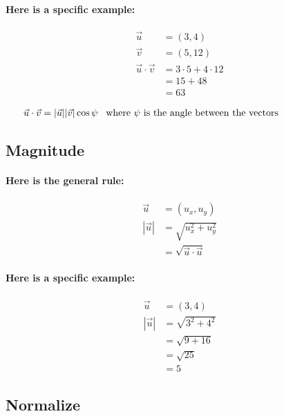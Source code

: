 \documentclass[twoside]{article}
\begin{document}
\paragraph{Here is a specific example:}

\begin{align*}
  \vec{u} & = (3, 4) \\
  \vec{v} & = (5, 12) \\
  \vec{u} \cdot \vec{v} & = 3 \cdot 5 + 4 \cdot 12 \\
                             & = 15 + 48 \\
                             & = 63
  \end{align*}

\begin{align*}
  \vec{u} \cdot \vec{v} & = |\vec{u}| |\vec{v}| \cos \psi \;\;\;
    \parbox{8cm}{where $\psi$ is the angle between the vectors}
  \end{align*}

\subsection{Magnitude}

\paragraph{Here is the general rule:}

\begin{align*}
  \vec{u} & = (u_x, u_y) \\
  |\vec{u}| & = \sqrt{ u_x^2 + u_y^2} \\
             & = \sqrt{ \vec{u} \cdot \vec{u} }
  \end{align*}

\paragraph{Here is a specific example:}

\begin{align*}
  \vec{u} & = (3, 4) \\
  |\vec{u}| & = \sqrt{ 3^2 + 4^2} \\
              & = \sqrt{9 + 16} \\
              & = \sqrt{ 25 } \\
              & = 5
  \end{align*}

\subsection{Normalize}
\end{document}
